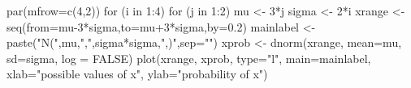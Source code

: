 \begin{Schunk}
\begin{Sinput}
 par(mfrow=c(4,2))
 for (i in 1:4){
      for (j in 1:2) {
         mu <- 3*j
         sigma <- 2*i
         xrange <- seq(from=mu-3*sigma,to=mu+3*sigma,by=0.2)
         mainlabel <- paste("N(",mu,",",sigma*sigma,",)",sep="")
         xprob <- dnorm(xrange, mean=mu, sd=sigma, log = FALSE)
         plot(xrange, xprob, type="l", main=mainlabel, xlab="possible values of x", ylab="probability of x")
      }
  }
\end{Sinput}
\end{Schunk}
